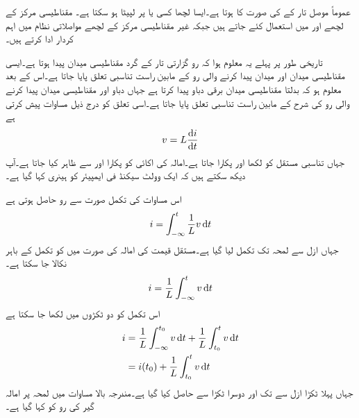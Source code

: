  عموماً موصل تار کے  کی صورت کا ہوتا ہے۔ایسا لچھا کسی  یا  پر لپیٹا ہو سکتا ہے۔ مقناطیسی مرکز کے لچھے  اور  میں استعمال کئے جاتے ہیں جبکہ غیر مقناطیسی مرکز کے لچھے مواصلاتی نظام میں اہم کردار ادا کرتے ہیں۔

تاریخی طور پر پہلے یہ معلوم ہوا کہ رو گزارتی تار کے گرد مقناطیسی میدان پیدا ہوتا ہے۔ایسی مقناطیسی میدان اور میدان پیدا کرنے والی رو کے مابین راست تناسبی تعلق پایا جاتا ہے۔اس کے بعد معلوم ہو کہ بدلتا مقناطیسی میدان برقی دباو پیدا کرتا ہے جہاں دباو اور مقناطیسی میدان پیدا کرنے والی رو کی شرح کے مابین راست تناسبی تعلق پایا جاتا ہے۔اسی تعلق کو درج ذیل مساوات پیش کرتی ہے
\begin{align}\label{مساوات_امالہ_بنیادی_مساوات_امالہ_الف}
v=L \frac{\dif i}{\dif t}
\end{align}
جہاں تناسبی مستقل کو  لکھا اور  پکارا جاتا ہے۔امالہ کی اکائی کو  پکارا اور  سے ظاہر کیا جاتا ہے۔آپ دیکھ سکتے ہیں کہ ایک وولٹ سیکنڈ فی ایمپیئر  کو ہینری کہا گیا ہے۔ 

اس مساوات کی تکمل صورت سے رو حاصل ہوتی ہے
\begin{align}
i=\int_{-\infty}^{t}\frac{1}{L} v \dif t
\end{align}
جہاں ازل  سے لمحہ  تک تکمل لیا گیا ہے۔مستقل قیمت کی امالہ کی صورت میں  کو تکمل کے باہر نکالا جا سکتا ہے۔
\begin{align}
i=\frac{1}{L}\int_{-\infty}^{t} v \dif t
\end{align}
اس تکمل کو دو ٹکڑوں میں لکھا جا سکتا ہے 
\begin{gather}
\begin{aligned}
i&=\frac{1}{L}\int_{-\infty}^{t_0} v \dif t+\frac{1}{L} \int_{t_0}^{t} v \dif t\\
&=i(t_0)+\frac{1}{L} \int_{t_0}^{t} v \dif t
\end{aligned}
\end{gather}
جہاں پہلا ٹکڑا ازل سے  تک اور دوسرا ٹکڑا  سے  حاصل کیا گیا ہے۔مندرجہ بالا مساوات میں لمحہ  پر امالہ گیر کی رو کو  کہا گیا ہے۔

